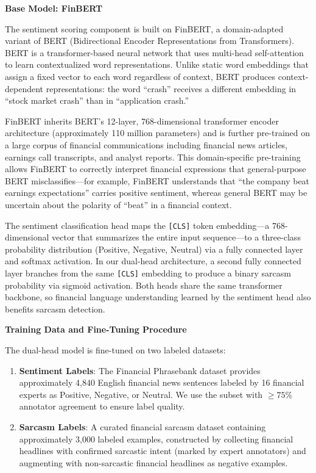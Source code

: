 \documentclass[12pt,a4paper]{article}
\begin{document}
\textbf{Base Model: FinBERT}

The sentiment scoring component is built on FinBERT, a domain-adapted variant of BERT (Bidirectional Encoder Representations from Transformers). BERT is a transformer-based neural network that uses multi-head self-attention to learn contextualized word representations. Unlike static word embeddings that assign a fixed vector to each word regardless of context, BERT produces context-dependent representations: the word ``crash'' receives a different embedding in ``stock market crash'' than in ``application crash.''

FinBERT inherits BERT's 12-layer, 768-dimensional transformer encoder architecture (approximately 110 million parameters) and is further pre-trained on a large corpus of financial communications including financial news articles, earnings call transcripts, and analyst reports. This domain-specific pre-training allows FinBERT to correctly interpret financial expressions that general-purpose BERT misclassifies---for example, FinBERT understands that ``the company beat earnings expectations'' carries positive sentiment, whereas general BERT may be uncertain about the polarity of ``beat'' in a financial context.

The sentiment classification head maps the \texttt{[CLS]} token embedding---a 768-dimensional vector that summarizes the entire input sequence---to a three-class probability distribution (Positive, Negative, Neutral) via a fully connected layer and softmax activation. In our dual-head architecture, a second fully connected layer branches from the same \texttt{[CLS]} embedding to produce a binary sarcasm probability via sigmoid activation. Both heads share the same transformer backbone, so financial language understanding learned by the sentiment head also benefits sarcasm detection.

\textbf{Training Data and Fine-Tuning Procedure}

The dual-head model is fine-tuned on two labeled datasets:
\begin{enumerate}
    \item \textbf{Sentiment Labels}: The Financial Phrasebank dataset provides approximately 4,840 English financial news sentences labeled by 16 financial experts as Positive, Negative, or Neutral. We use the subset with $\geq 75\%$ annotator agreement to ensure label quality.
    \item \textbf{Sarcasm Labels}: A curated financial sarcasm dataset containing approximately 3,000 labeled examples, constructed by collecting financial headlines with confirmed sarcastic intent (marked by expert annotators) and augmenting with non-sarcastic financial headlines as negative examples.
\end{enumerate}
\end{document}
